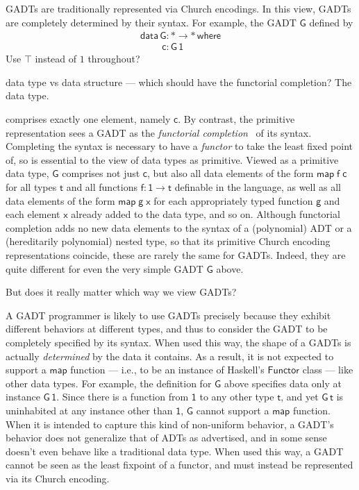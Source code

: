 \documentclass[acmsmall,screen,review,anonymous]{acmart}
\theoremstyle{definition}
\begin{document}
GADTs are traditionally represented via Church encodings. In this
view, GADTs are completely determined by their syntax. For example,
the GADT $\mathsf{G}$ defined by
\[\begin{array}{l}
\mathsf{data\,G : * \to *\,where}\\
\mathsf{\;\;\;\;\;\;\;\;c : G\,1}
\end{array}\]
{\color{blue} Use $\top$ instead of $1$ throughout?}

\noindent
{\color{blue} data type vs data structure --- which should have the
functorial completion? The data type.}

\noindent
comprises exactly one element, namely $\mathsf{c}$. By contrast, the
primitive representation sees a GADT as the {\em functorial
  completion}~\cite{jp19} of its syntax. {\color{blue} Completing the
  syntax is necessary to have a {\em functor} to take the least fixed
  point of, so is essential to the view of data types as primitive.}
Viewed as a primitive data type, $\mathsf{G}$ comprises not just
$\mathsf{c}$, but also all data elements of the form
$\mathsf{map\;f\;c}$ for all types $\mathsf{t}$ and all functions
$\mathsf{f : 1 \to t}$ definable in the language, as well as all data
elements of the form $\mathsf{map\;g\;x}$ for each appropriately typed
function $\mathsf{g}$ and each element $\mathsf{x}$ already added to
the data type, and so on.  Although functorial completion adds no new
data elements to the syntax of a (polynomial) ADT or a (hereditarily
polynomial) nested type, so that its primitive Church encoding
representations coincide, these are rarely the same for GADTs.
Indeed, they are quite different for even the very simple GADT
$\mathsf{G}$ above.

But does it really matter which way we view GADTs?

A GADT programmer is likely to use GADTs precisely because they
exhibit different behaviors at different types, and thus to consider
the GADT to be completely specified by its syntax. When used this way,
the shape of a GADTs is actually {\em determined} by the data it
contains. As a result, it is not expected to support a $\mathsf{map}$
function --- i.e., to be an instance of Haskell's $\mathsf{Functor}$
class --- like other data types. For example, the definition for
$\mathsf{G}$ above specifies data only at instance $\mathsf{G\,1}$.
Since there is a function from $\mathsf{1}$ to any other type
$\mathsf{t}$, and yet $\mathsf{G\,t}$ is uninhabited at any instance
other than $\mathsf{1}$, $\mathsf{G}$ cannot support a $\mathsf{map}$
function. When it is intended to capture this kind of non-uniform
behavior, a GADT's behavior does not generalize that of ADTs as
advertised, and in some sense doesn't even behave like a traditional
data type.  When used this way, a GADT cannot be seen as the least
fixpoint of a functor, and must instead be represented via its Church
encoding.
\end{document}
